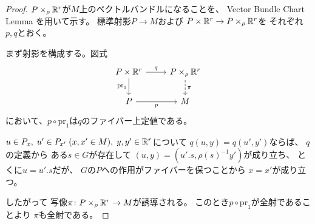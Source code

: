 \documentclass[report]{jlreq}
\begin{document}
\begin{proof}
    $P \times_\rho \mathbb{R}^r$が$M$上のベクトルバンドルになることを、
    Vector Bundle Chart Lemma を用いて示す。
   標準射影$P \to M$および
    $P \times \mathbb{R}^r \to P \times_\rho \mathbb{R}^r$を
    それぞれ$p, q$とおく。

    まず射影を構成する。図式
    \begin{equation}
        \begin{tikzcd}
            P \times \R^r
                \ar{d}[swap]{\mathrm{pr}_1}
                \ar{r}{q}
                & P \times_\rho \R^r
                \ar[dashed]{d}{\pi} \\
            P \ar{r}[swap]{p}
                & M
        \end{tikzcd}
    \end{equation}
    において、$p \circ \mathrm{pr}_1$は$q$のファイバー上定値である。
    \begin{innerproof}
        $u \in P_x, \; u' \in P_{x'} \; (x, x' \in M),
        \; y, y' \in \mathbb{R}^r$について
        $q(u, y) = q(u', y')$ならば、
        $q$の定義から
        ある$s \in G$が存在して
        $(u, y) = (u' . s, \rho(s)^{-1} y')$が成り立ち、
        とくに$u = u' . s$だが、
        $G$の$P$への作用がファイバーを保つことから
        $x = x'$が成り立つ。
    \end{innerproof}
    したがって
    写像$\pi \colon P \times_\rho \mathbb{R}^r \to M$が誘導される。
    このとき$p \circ \mathrm{pr}_1$が全射であることより
    $\pi$も全射である。


\end{proof}
\end{document}
